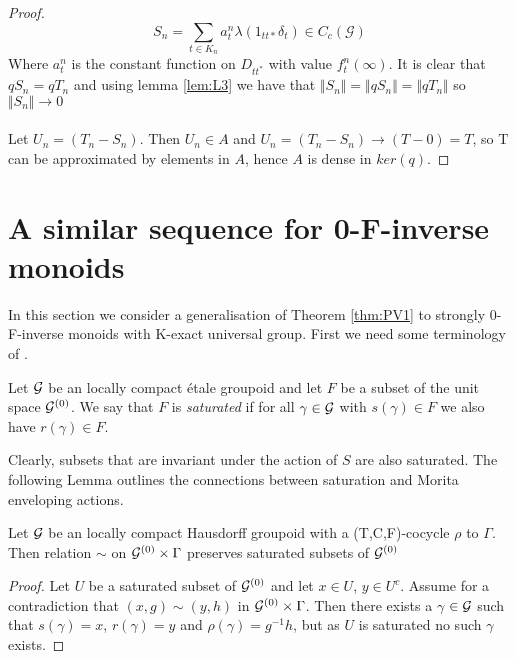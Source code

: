 \begin{corollary}
\begin{proof}
\begin{equation}
S_{n} = \sum_{t \in K_{n}} a^{n}_{t}\lambda(1_{tt*}\delta_{t}) \in C_{c}(\mathcal{G})
\end{equation}
Where $a^{n}_{t}$ is the constant function on $D_{tt^{*}}$ with value $f_{t}^{n}(\infty)$. It is clear that $qS_{n}=qT_{n}$ and using lemma \ref{lem:L3} we have that $\Vert S_{n} \Vert = \Vert qS_{n} \Vert = \Vert qT_{n} \Vert$ so $\Vert S_{n} \Vert \rightarrow 0$\\
\\
Let $U_{n}=(T_{n}-S_{n})$. Then $U_{n} \in A$ and $U_{n}=(T_{n}-S_{n}) \rightarrow (T-0)=T$, so T can be approximated by elements in $A$, hence $A$ is dense in $ker(q)$.
\end{proof} 
\section{A similar sequence for 0-F-inverse monoids}\label{sect:S2}
In this section we consider a generalisation of Theorem \ref{thm:PV1} to strongly 0-F-inverse monoids with K-exact universal group. First we need some terminology of \cite{MR1911663}.

\begin{definition}
Let $\mathcal{G}$ be an locally compact \'etale groupoid and let $F$ be a subset of the unit space $\mathcal{G}^{(0)}$. We say that $F$ is \textit{saturated} if for all $\gamma \in \mathcal{G}$ with $s(\gamma) \in F$ we also have $r(\gamma)\in F$. 
\end{definition}

Clearly, subsets that are invariant under the action of $S$ are also saturated. The following Lemma outlines the connections between saturation and Morita enveloping actions.

\begin{lemma}\label{Lem:Cut}
Let $\mathcal{G}$ be an \etale locally compact Hausdorff groupoid with a (T,C,F)-cocycle $\rho$ to $\Gamma$. Then relation $\sim$ on $\mathcal{G}^{(0)} \times \Gamma$ preserves saturated subsets of $\mathcal{G}^{(0)}$
\end{lemma}
\begin{proof}
Let $U$ be a saturated subset of $\mathcal{G}^{(0)}$ and let $x \in U$, $y \in U^{c}$. Assume for a contradiction that $(x,g) \sim (y,h)$ in $\mathcal{G}^{(0)} \times \Gamma$. Then there exists a $\gamma$ $\in \mathcal{G}$ such that $s(\gamma)=x$, $r(\gamma)=y$ and $\rho(\gamma)=g^{-1}h$, but as $U$ is saturated no such $\gamma$ exists. 
\end{proof}


\end{corollary}
